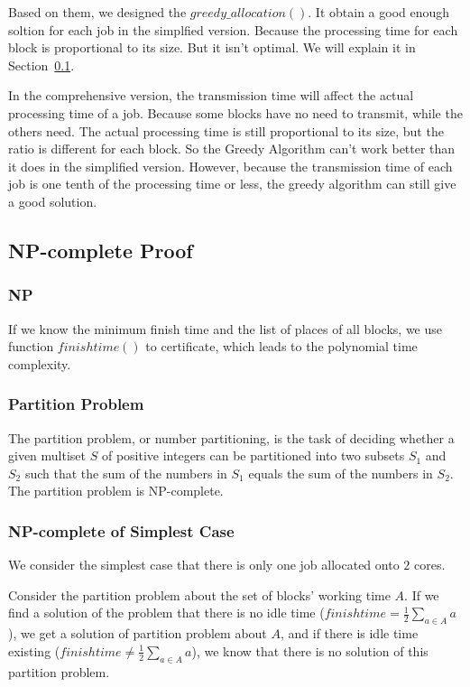 \documentclass{llncs}
\begin{document}
	Based on them, we designed the $greedy\_allocation()$. It obtain a good enough soltion for each job in the simplfied version. Because the processing time for each block is proportional to its size. But it isn't optimal. We will explain it in Section~\ref{subsec-npc}. 
	
	In the comprehensive version, the transmission time will affect the actual processing time of a job. Because some blocks have no need to transmit, while the others need. The actual processing time is still proportional to its size, but the ratio is different for each block. So the Greedy Algorithm can't work better than it does in the simplified version. However, because the transmission time of each job is one tenth of the processing time or less, the greedy algorithm can still give a good solution. 
	
	\subsection{NP-complete Proof} \label{subsec-npc}
	\subsubsection{NP}
	If we know the minimum finish time and the list of places of all blocks, we use function $finishtime()$ to certificate, which leads to the polynomial time complexity.
	
	\subsubsection{Partition Problem}
	The partition problem, or number partitioning, is the task of deciding whether a given multiset $S$ of positive integers can be partitioned into two subsets $S_1$ and $S_2$ such that the sum of the numbers in $S_1$ equals the sum of the numbers in $S_2$. The partition problem is NP-complete\cite{ref_article1}.
	
	\subsubsection{NP-complete of Simplest Case}
	We consider the simplest case that there is only one job allocated onto $2$ cores. 
	
	Consider the partition problem about the set of blocks' working time $A$. If we find a solution of the problem that there is no idle time ($finishtime = \frac{1}{2}\sum_{a \in A}a$), we get a solution of partition problem about $A$, and if there is idle time existing ($finishtime \neq \frac{1}{2}\sum_{a \in A}a$), we know that there is no solution of this partition problem.
	
\end{document}
